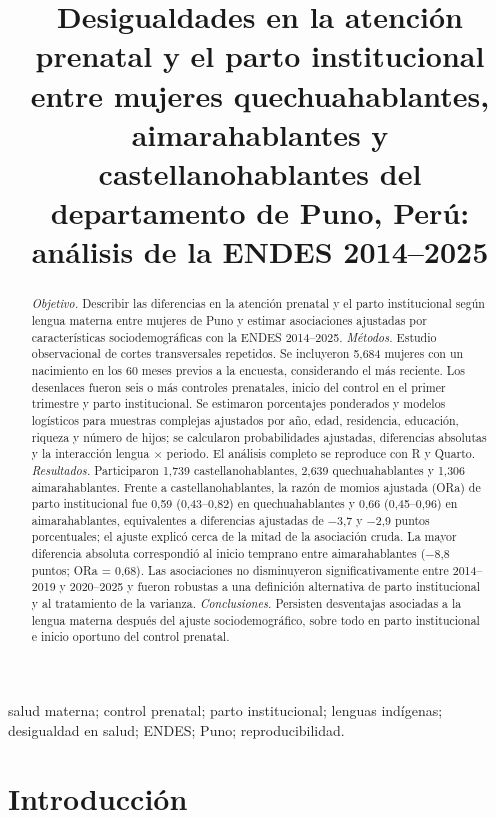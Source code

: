 \documentclass[
  spanish,
  letterpaper,
  conference]{IEEEtran}
\author{\IEEEauthorblockN{Fiorella Yannet Paredes Coaguila, Mario Wilfredo Ramirez Puma,\\ Jefry Erick Quispe Ramos y Paolo Fontanil Barrera}
\IEEEauthorblockA{Universidad Nacional del Altiplano -- Puno\\
Escuela Profesional de Ingeniería Estadística e Informática\\
Puno, Perú}}
\title{Desigualdades en la atención prenatal y el parto institucional
entre mujeres quechuahablantes, aimarahablantes y castellanohablantes
del departamento de Puno, Perú: análisis de la ENDES 2014--2025}
\author{}
\date{}
\begin{document}
\maketitle


\begin{abstract}
\textit{Objetivo.} Describir las diferencias en la atención prenatal y el parto institucional según lengua materna entre mujeres de Puno y estimar asociaciones ajustadas por características sociodemográficas con la ENDES 2014--2025. \textit{Métodos.} Estudio observacional de cortes transversales repetidos. Se incluyeron 5,684 mujeres con un nacimiento en los 60 meses previos a la encuesta, considerando el más reciente. Los desenlaces fueron seis o más controles prenatales, inicio del control en el primer trimestre y parto institucional. Se estimaron porcentajes ponderados y modelos logísticos para muestras complejas ajustados por año, edad, residencia, educación, riqueza y número de hijos; se calcularon probabilidades ajustadas, diferencias absolutas y la interacción lengua $\times$ periodo. El análisis completo se reproduce con R y Quarto. \textit{Resultados.} Participaron 1,739 castellanohablantes, 2,639 quechuahablantes y 1,306 aimarahablantes. Frente a castellanohablantes, la razón de momios ajustada (ORa) de parto institucional fue 0,59 (0,43--0,82) en quechuahablantes y 0,66 (0,45--0,96) en aimarahablantes, equivalentes a diferencias ajustadas de $-$3,7 y $-$2,9 puntos porcentuales; el ajuste explicó cerca de la mitad de la asociación cruda. La mayor diferencia absoluta correspondió al inicio temprano entre aimarahablantes ($-$8,8 puntos; ORa = 0,68). Las asociaciones no disminuyeron significativamente entre 2014--2019 y 2020--2025 y fueron robustas a una definición alternativa de parto institucional y al tratamiento de la varianza. \textit{Conclusiones.} Persisten desventajas asociadas a la lengua materna después del ajuste sociodemográfico, sobre todo en parto institucional e inicio oportuno del control prenatal.
\end{abstract}
\begin{IEEEkeywords}
salud materna; control prenatal; parto institucional; lenguas indígenas; desigualdad en salud; ENDES; Puno; reproducibilidad.
\end{IEEEkeywords}

\section{Introducción}\label{introducciuxf3n}
\end{document}
